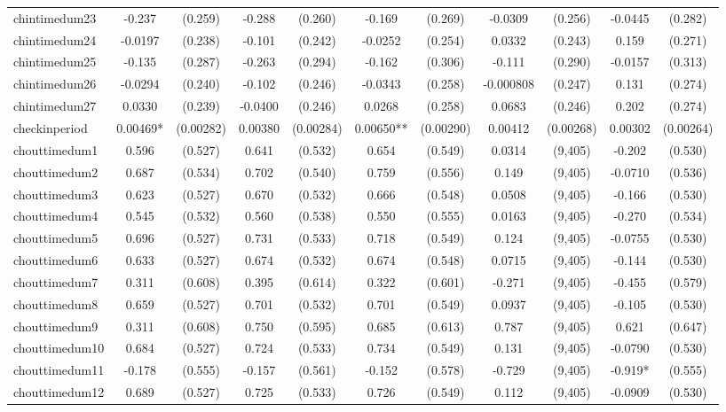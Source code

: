 \documentclass[]{article}
\begin{document}
\begin{tabular}{lcccccccccc}
chintimedum23 & -0.237 & (0.259) & -0.288 & (0.260) & -0.169 & (0.269) & -0.0309 & (0.256) & -0.0445 & (0.282) \\
chintimedum24 & -0.0197 & (0.238) & -0.101 & (0.242) & -0.0252 & (0.254) & 0.0332 & (0.243) & 0.159 & (0.271) \\
chintimedum25 & -0.135 & (0.287) & -0.263 & (0.294) & -0.162 & (0.306) & -0.111 & (0.290) & -0.0157 & (0.313) \\
chintimedum26 & -0.0294 & (0.240) & -0.102 & (0.246) & -0.0343 & (0.258) & -0.000808 & (0.247) & 0.131 & (0.274) \\
chintimedum27 & 0.0330 & (0.239) & -0.0400 & (0.246) & 0.0268 & (0.258) & 0.0683 & (0.246) & 0.202 & (0.274) \\
checkinperiod & 0.00469* & (0.00282) & 0.00380 & (0.00284) & 0.00650** & (0.00290) & 0.00412 & (0.00268) & 0.00302 & (0.00264) \\
chouttimedum1 & 0.596 & (0.527) & 0.641 & (0.532) & 0.654 & (0.549) & 0.0314 & (9,405) & -0.202 & (0.530) \\
chouttimedum2 & 0.687 & (0.534) & 0.702 & (0.540) & 0.759 & (0.556) & 0.149 & (9,405) & -0.0710 & (0.536) \\
chouttimedum3 & 0.623 & (0.527) & 0.670 & (0.532) & 0.666 & (0.548) & 0.0508 & (9,405) & -0.166 & (0.530) \\
chouttimedum4 & 0.545 & (0.532) & 0.560 & (0.538) & 0.550 & (0.555) & 0.0163 & (9,405) & -0.270 & (0.534) \\
chouttimedum5 & 0.696 & (0.527) & 0.731 & (0.533) & 0.718 & (0.549) & 0.124 & (9,405) & -0.0755 & (0.530) \\
chouttimedum6 & 0.633 & (0.527) & 0.674 & (0.532) & 0.674 & (0.548) & 0.0715 & (9,405) & -0.144 & (0.530) \\
chouttimedum7 & 0.311 & (0.608) & 0.395 & (0.614) & 0.322 & (0.601) & -0.271 & (9,405) & -0.455 & (0.579) \\
chouttimedum8 & 0.659 & (0.527) & 0.701 & (0.532) & 0.701 & (0.549) & 0.0937 & (9,405) & -0.105 & (0.530) \\
chouttimedum9 & 0.311 & (0.608) & 0.750 & (0.595) & 0.685 & (0.613) & 0.787 & (9,405) & 0.621 & (0.647) \\
chouttimedum10 & 0.684 & (0.527) & 0.724 & (0.533) & 0.734 & (0.549) & 0.131 & (9,405) & -0.0790 & (0.530) \\
chouttimedum11 & -0.178 & (0.555) & -0.157 & (0.561) & -0.152 & (0.578) & -0.729 & (9,405) & -0.919* & (0.555) \\
chouttimedum12 & 0.689 & (0.527) & 0.725 & (0.533) & 0.726 & (0.549) & 0.112 & (9,405) & -0.0909 & (0.530) \\

\end{tabular}
\end{document}
